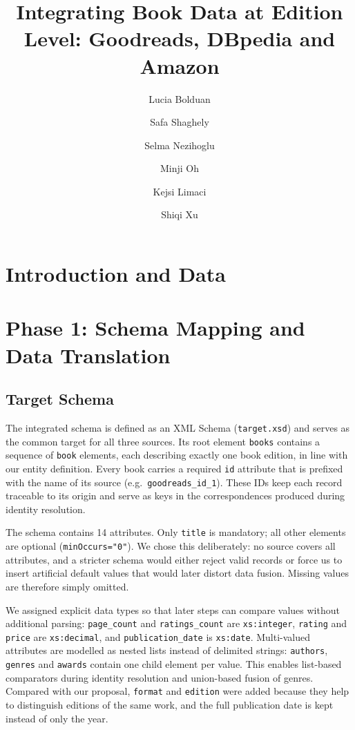 \documentclass[runningheads]{llncs}
\begin{document}
\title{Integrating Book Data at Edition Level: Goodreads, DBpedia and Amazon}
\author{Lucia Bolduan  \and Safa Shaghely  \and Selma Nezihoglu  \and Minji Oh  \and Kejsi Limaci  \and Shiqi Xu }
\maketitle

\begin{abstract}
\end{abstract}

\section{Introduction and Data}

\section{Phase 1: Schema Mapping and Data Translation}

\subsection{Target Schema}
The integrated schema is defined as an XML Schema (\texttt{target.xsd}) and
serves as the common target for all three sources. Its root element
\texttt{books} contains a sequence of \texttt{book} elements, each describing
exactly one book edition, in line with our entity definition. Every book
carries a required \texttt{id} attribute that is prefixed with the name of its
source (e.g.\ \texttt{goodreads\_id\_1}). These IDs keep each record traceable
to its origin and serve as keys in the correspondences produced during
identity resolution.

The schema contains 14 attributes. Only \texttt{title} is mandatory; all other
elements are optional (\texttt{minOccurs="0"}). We chose this deliberately: no
source covers all attributes, and a stricter schema would either reject valid
records or force us to insert artificial default values that would later
distort data fusion. Missing values are therefore simply omitted.

We assigned explicit data types so that later steps can compare values without
additional parsing: \texttt{page\_count} and \texttt{ratings\_count} are
\texttt{xs:integer}, \texttt{rating} and \texttt{price} are
\texttt{xs:decimal}, and \texttt{publication\_date} is \texttt{xs:date}.
Multi-valued attributes are modelled as nested lists instead of delimited
strings: \texttt{authors}, \texttt{genres} and \texttt{awards} contain one
child element per value. This enables list-based comparators during identity
resolution and union-based fusion of genres. Compared with our proposal,
\texttt{format} and \texttt{edition} were added because they help to
distinguish editions of the same work, and the full publication date is kept
instead of only the year.
\end{document}
